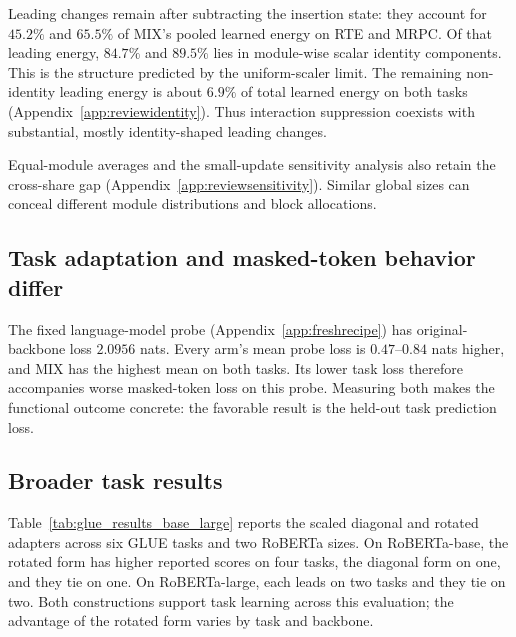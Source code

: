 \documentclass{article}
\begin{document}
Leading changes remain after subtracting the insertion state: they account for $45.2\%$ and $65.5\%$ of MIX's pooled learned energy on RTE and MRPC. Of that leading energy, $84.7\%$ and $89.5\%$ lies in module-wise scalar identity components. This is the structure predicted by the uniform-scaler limit. The remaining non-identity leading energy is about $6.9\%$ of total learned energy on both tasks (Appendix~\ref{app:reviewidentity}). Thus interaction suppression coexists with substantial, mostly identity-shaped leading changes.

Equal-module averages and the small-update sensitivity analysis also retain the cross-share gap (Appendix~\ref{app:reviewsensitivity}). Similar global sizes can conceal different module distributions and block allocations.

\subsection{Task adaptation and masked-token behavior differ}
The fixed language-model probe (Appendix~\ref{app:freshrecipe}) has original-backbone loss $2.0956$ nats. Every arm's mean probe loss is $0.47$--$0.84$ nats higher, and MIX has the highest mean on both tasks. Its lower task loss therefore accompanies worse masked-token loss on this probe. Measuring both makes the functional outcome concrete: the favorable result is the held-out task prediction loss.

\subsection{Broader task results}
Table~\ref{tab:glue_results_base_large} reports the scaled diagonal and rotated adapters across six GLUE tasks and two RoBERTa sizes. On RoBERTa-base, the rotated form has higher reported scores on four tasks, the diagonal form on one, and they tie on one. On RoBERTa-large, each leads on two tasks and they tie on two. Both constructions support task learning across this evaluation; the advantage of the rotated form varies by task and backbone.
\end{document}
